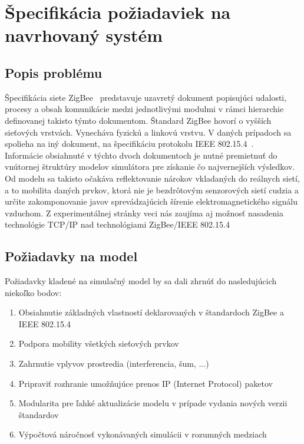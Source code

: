 \chapter{Špecifikácia požiadaviek na navrhovaný systém}

\section{Popis problému}
\indent\indent Špecifikácia siete ZigBee~\cite{zigbee08} predstavuje uzavretý dokument popisujúci udalosti, procesy a obsah komunikácie medzi jednotlivými modulmi v rámci hierarchie definovanej takisto týmto dokumentom. Štandard ZigBee hovorí o vyšších sieťových vrstvách. Vynecháva fyzickú a linkovú vrstvu. V daných prípadoch sa spolieha na iný dokument, na špecifikáciu protokolu IEEE 802.15.4\texttrademark~\cite{ieee06}.\\
\indent\indent Informácie obsiahnuté v týchto dvoch dokumentoch je nutné premietnuť do vnú\-tornej štruktúry modelov simulátora pre získanie čo najvernejších výsledkov. Od modelu sa takisto očakáva reflektovanie nárokov vkladaných do reálnych sietí, a to mobilita daných prvkov, ktorá nie je bezdrôtovým senzorových sietí cudzia a určite zakomponovanie javov sprevádzajúcich šírenie elektromagnetického signálu vzduchom. Z experimentálnej stránky veci nás zaujíma aj možnosť nasadenia technológie TCP/IP nad technológiami ZigBee/IEEE 802.15.4

\section{Požiadavky na model}
\indent\indent Požiadavky kladené na simulačný model by sa dali zhrnúť do nasledujúcich niekoľko bodov:
\begin{enumerate}
  \item Obsiahnutie základných vlastností deklarovaných v štandardoch ZigBee a IEEE 802.15.4
  \item Podpora mobility všetkých sieťových prvkov
  \item Zahrnutie vplyvov prostredia (interferencia, šum, ...)
  \item Pripraviť rozhranie umožňujúce prenos IP (Internet Protocol) paketov
  \item Modularita pre ľahké aktualizácie modelu v prípade vydania nových verzii štandardov
  \item Výpočtová náročnosť vykonávaných simulácii v rozumných medziach
\end{enumerate}
